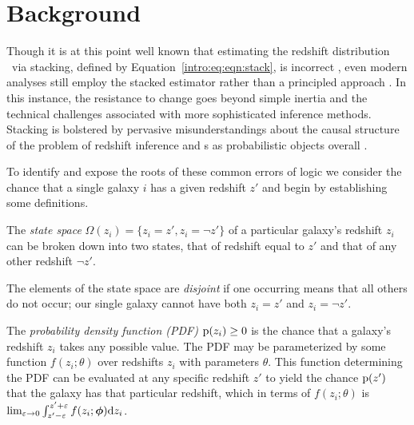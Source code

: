 \section{Background}


Though it is at this point well known that estimating the redshift distribution \Nz\ via stacking, defined by Equation~\ref{intro:eq:eqn:stack}, is incorrect \citep{leistedt_hierarchical_2016, Malz:chippr}, even modern analyses still employ the stacked estimator rather than a principled approach \citep{sheldon_photometric_2012, hoyle_dark_2017}.
In this instance, the resistance to change goes beyond simple inertia and the technical challenges associated with more sophisticated inference methods.
Stacking is bolstered by pervasive misunderstandings about the causal structure of the problem of redshift inference and \pzpdf s as probabilistic objects overall \citep{gruen_sumzz_2017, jarvis_rmjarvis_2018, malz_aimalz_2018}.


To identify and expose the roots of these common errors of logic we consider the chance that a single galaxy $i$ has a given redshift $z'$ and begin by establishing some definitions.

\begin{definition}\label{def:binarystatespace}
	The \textit{state space} $\Omega(z_{i}) = \{z_{i} = z', z_{i} = \lnot z'\}$ of a particular galaxy's redshift $z_{i}$ can be broken down into two states, that of redshift equal to $z'$ and that of any other redshift $\lnot z'$.
\end{definition}

\begin{definition}\label{def:disjoint}
	The elements of the state space are \textit{disjoint} if one occurring means that all others do not occur; our single galaxy cannot have both $z_{i} = z'$ and $z_{i} = \lnot z'$.
\end{definition}

\begin{definition}\label{def:pdens}
	The \textit{probability density function (PDF)} $\mathrm{p}(z_{i}) \geq 0$ is the chance that a galaxy's redshift $z_{i}$ takes any possible value.
	The PDF may be parameterized by some function $f(z_{i}; \theta)$ over redshifts $z_{i}$ with parameters $\theta$.
	This function determining the PDF can be evaluated at any specific redshift $z'$ to yield the chance $\mathrm{p}(z')$ that the galaxy has that particular redshift, which in terms of $f(z_{i}; \theta)$ is $\lim_{\varepsilon \to 0} \int_{z' - \varepsilon}^{z' + \varepsilon} f(z_{i}; {\boldsymbol{\phi}}) \mathrm{d}z_{i}$.
\end{definition}

